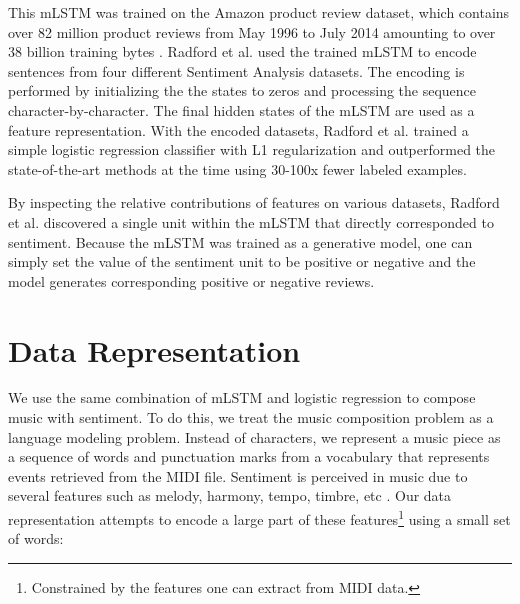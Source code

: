 




This mLSTM was trained on the Amazon product review dataset, which contains over 82 million
product reviews from May 1996 to July 2014 amounting to over 38 billion
training bytes \cite{He2016}. Radford et al. \cite{radford_2017} used the trained mLSTM
to encode sentences from four different Sentiment Analysis datasets.
The encoding is performed by initializing the the states to zeros and
processing the sequence character-by-character. The final hidden states of
the mLSTM are used as a feature representation. With the encoded
datasets, Radford et al. \cite{radford_2017} trained a simple logistic
regression classifier with L1 regularization and outperformed
the state-of-the-art methods at the time using 30-100x fewer
labeled examples.

By inspecting the relative contributions of features on various datasets,
Radford et al. \cite{radford_2017} discovered a single unit within the
mLSTM that directly corresponded to sentiment. Because the mLSTM was
trained as a generative model, one can simply set the value of the
sentiment unit to be positive or negative and the model generates
corresponding positive or negative reviews.

\section{Data Representation}
\label{sec:representation}

We use the same combination of mLSTM and logistic
regression to compose music with sentiment. To do this, we
treat the music composition problem as a language modeling problem.
Instead of characters, we represent a music piece as a
sequence of words and punctuation marks from a vocabulary that represents
events retrieved from the MIDI file. Sentiment is perceived in
music due to several features such as melody, harmony, tempo, timbre,
etc \cite{kim2010music}. Our data representation attempts to encode a large part
of these features\footnote{Constrained by the features one can extract from MIDI data.}
using a small set of words:

